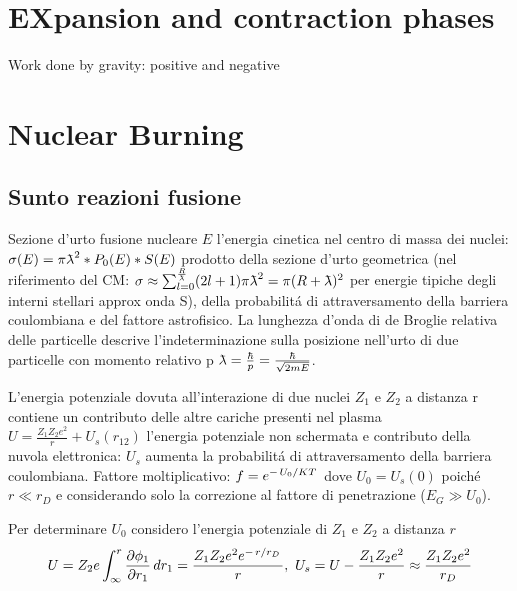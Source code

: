 \section{EXpansion and contraction phases}

\begin{frame}{Work done by gravity: positive and negative}

\end{frame}


\section{Nuclear Burning}

\subsection{Sunto reazioni fusione}
\begin{frame}{Sezione d'urto fusione nucleare}
$E$ l'energia cinetica nel centro di massa dei nuclei: $\sigma(E)=\pi\lambdabar^2*P_0(E)*S(E)$
prodotto della sezione d'urto geometrica (nel riferimento del CM: $\sigma\approx\sum_{l=0}^{\frac{R}{\lambdabar}}(2l+1)\pi\lambdabar^2=\pi(R+\lambdabar)^2$
per energie tipiche degli interni stellari approx onda S), della probabilit\'a di attraversamento della barriera coulombiana e del fattore astrofisico. La lunghezza d'onda di de Broglie relativa delle particelle descrive l'indeterminazione sulla posizione nell'urto di due particelle con momento relativo p $\lambdabar=\frac{\hbar}{p}=\frac{\hbar}{\sqrt{2mE}}$.

L'energia potenziale dovuta all'interazione di due nuclei $Z_1$ e $Z_2$ a distanza r contiene un contributo delle altre cariche presenti nel plasma $U=\frac{Z_1Z_2e^2}{r}+U_s(r_{12})$
l'energia potenziale non schermata e contributo della nuvola elettronica: $U_s$ aumenta la probabilit\'a di attraversamento della barriera coulombiana. Fattore moltiplicativo: $f=e^{-\left.{U_0}\middle/{KT}\right.}$ dove $U_0=U_s(0)$ poich\'e $r\ll r_D$ e considerando solo la correzione al fattore di penetrazione ($E_G\gg U_0$).

Per determinare $U_0$ considero l'energia potenziale di $Z_1$ e $Z_2$ a distanza $r$
\begin{equation*}
U=Z_2e\int_{\infty}^r\PDy{r_1}{\phi_1}\,dr_1=\frac{Z_1Z_2e^2\exp{-\midfrac{r}{r_D}}}{r},\ U_s=U-\frac{Z_1Z_2e^2}{r}\approx\frac{Z_1Z_2e^2}{r_D}
\end{equation*}
\end{frame}

